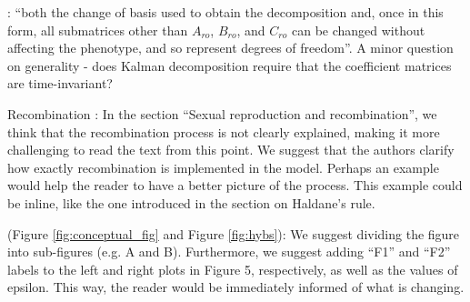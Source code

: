 
\begin{point}{}
  : ``both the change of basis used to obtain the decomposition and, once in this form, all submatrices other than $A_{ro}$, $B_{ro}$, and $C_{ro}$ can be changed without affecting the phenotype, and so represent degrees of freedom''. A minor question on generality - does Kalman decomposition require that the coefficient matrices are time-invariant?
\end{point}


\begin{point}{Recombination}
 : In the section ``Sexual reproduction and recombination'', we think that the recombination process is not clearly explained, making it more challenging to read the text from this point. We suggest that the authors clarify how exactly recombination is implemented in the model. Perhaps an example would help the reader to have a better picture of the process. This example could be inline, like the one introduced in the section on Haldane's rule.
\end{point}


\begin{point}{}
  (Figure \ref{fig:conceptual_fig} and Figure \ref{fig:hybs}): We suggest dividing the figure into sub-figures (e.g. A and B). Furthermore, we suggest adding ``F1'' and ``F2'' labels to the left and right plots in Figure 5, respectively, as well as the values of epsilon. This way, the reader would be immediately informed of what is changing.
\end{point}


